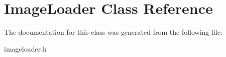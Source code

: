 \hypertarget{class_image_loader}{\section{Image\-Loader Class Reference}
\label{class_image_loader}
}


The documentation for this class was generated from the following file\-:\begin{DoxyCompactItemize}
\item 
imageloader.\-h\end{DoxyCompactItemize}
